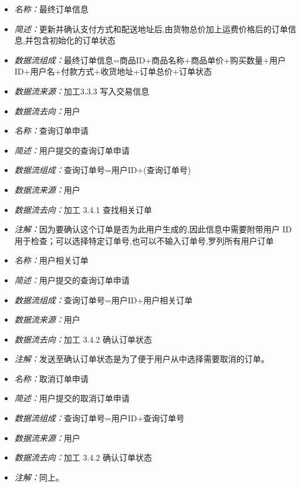 \documentclass{article}
\begin{document}
\begin{CJK*}{UTF8}{gbsn}
\vspace{-1mm}

\begin{itemize}
	\item \textit{名称：}最终订单信息
	\item \textit{简述：}更新并确认支付方式和配送地址后,由货物总价加上运费价格后的订单信息,并包含初始化的订单状态
	\item \textit{数据流组成：}最终订单信息=商品ID+商品名称+商品单价+购买数量+用户ID+用户名+付款方式+收货地址+订单总价+订单状态
	\item \textit{数据流来源：}加工3.3.3 写入交易信息
	\item \textit{数据流去向：}用户
\end{itemize}

\vspace{-1mm}

\begin{itemize}
	\item \textit{名称：}查询订单申请
	\item \textit{简述：}用户提交的查询订单申请
	\item \textit{数据流组成：}查询订单号=用户ID+(查询订单号)
	\item \textit{数据流来源：}用户
	\item \textit{数据流去向：}加工 3.4.1 查找相关订单
	\item \textit{注解：}因为要确认这个订单是否为此用户生成的,因此信息中需要附带用户 ID 用于检查；可以选择特定订单号,也可以不输入订单号,罗列所有用户订单
\end{itemize}

\vspace{-1mm}

\begin{itemize}
\item \textit{名称：}用户相关订单
	\item \textit{简述：}用户提交的查询订单申请
	\item \textit{数据流组成：}查询订单号=用户ID+用户相关订单
	\item \textit{数据流来源：}用户
	\item \textit{数据流去向：}加工 3.4.2 确认订单状态
	\item \textit{注解：}发送至确认订单状态是为了便于用户从中选择需要取消的订单。
\end{itemize}

\vspace{-1mm}

\begin{itemize}
\item \textit{名称：}取消订单申请
	\item \textit{简述：}用户提交的取消订单申请
	\item \textit{数据流组成：}查询订单号=用户ID+查询订单号
	\item \textit{数据流来源：}用户
	\item \textit{数据流去向：}加工 3.4.2 确认订单状态
	\item \textit{注解：}同上。
\end{itemize}


\end{CJK*}
\end{document}
